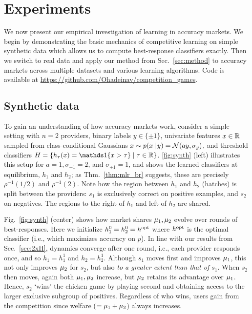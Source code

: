 


\section{Experiments}
\label{sec:exp}

We now present our empirical investigation of learning in accuracy markets.
We begin by demonstrating the basic mechanics of competitive learning on simple synthetic data which allows us to compute best-response classifiers exactly.
Then we switch to real data and apply our method from Sec.~\ref{sec:method} to accuracy markets across multiple datasets
and various learning algorithms.
Code is available at \url{https://github.com/Ohadeinav/competition_games}.

\subsection{Synthetic data}
\label{sec:exp:synth}
To gain an understanding of how accuracy markets work,
consider a simple setting with $n=2$ providers, binary labels $y \in \{\pm 1\}$,
univariate features $x \in \mathbb{R}$ sampled from class-conditional Gaussians
$x \sim p(x \,|\,y) = {\cal{N}}(ay,\sigma_y)$,
and threshold classifiers $H=\{h_\tau(x) = \one{x > \tau} \mid \tau \in \R\}$.
\cref{fig:synth} (left) illustrates this setup for
$a=1,\sigma_{-1}=2$,
and $\sigma_{+1}=1$,
and shows the learned classifiers at equilibrium,
$h_1$ and $h_2$;
as Thm.~\ref{thm:mlr_br} suggests, these are precisely $\rho^{-1}(1/2)$ and $\rho^{-1}(2)$.
Note how the region between $h_1$ and $h_2$ (hatches) is split between the providers:
$s_1$ is exclusively correct on positive examples,
and $s_2$ on negatives.
The regions to the right of $h_1$ and left of $h_2$ are shared. 


Fig.~\ref{fig:synth} (center) shows how market shares $\mu_1,\mu_2$ evolve over 
rounds of best-responses.
Here we initialize $h_1^0=h_2^0=h^{\mathrm{opt}}$ where
$h^{\mathrm{opt}}$ is the optimal classifier (i.e., which maximizes accuracy on $p$).
In line with our results from Sec.~\ref{sec:2xH},
dynamics converge after one round, i.e., each provider responds once,
and so $h_1=h_1^1$ and $h_2=h_2^1$.
Although $s_1$ moves first and improves $\mu_1$,
this not only improves $\mu_2$ for $s_2$, but also \emph{to a greater extent than that of $s_1$}.
When $s_2$ then moves, again both $\mu_1,\mu_2$ increase,
but $\mu_2$ retains its advantage over $\mu_1$.
Hence, $s_2$ `wins' the chicken game by playing second
and obtaining access to the larger exclusive subgroup of positives.
Regardless of who wins,
users gain from the competition since welfare ($=\mu_1+\mu_2$)
always increases.
\squeeze

